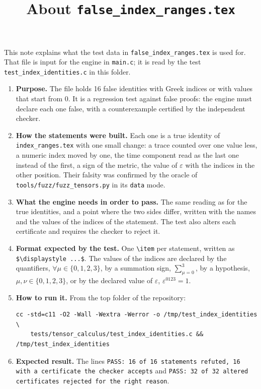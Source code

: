 \documentclass[11pt,a4paper]{article}
\title{About \texttt{false\_index\_ranges.tex}}
\author{}
\date{}
\begin{document}
\maketitle
This note explains what the test data in \texttt{false\_index\_ranges.tex} is used for. That file is input for the engine in \texttt{main.c}; it is read by the test \texttt{test\_index\_identities.c} in this folder.

\begin{enumerate}
\item \textbf{Purpose.} The file holds 16 false identities with Greek indices or with values that start from 0. It is a regression test against false proofs: the engine must declare each one false, with a counterexample certified by the independent checker.

\item \textbf{How the statements were built.} Each one is a true identity of \texttt{index\_ranges.tex} with one small change: a trace counted over one value less, a numeric index moved by one, the time component read as the last one instead of the first, a sign of the metric, the value of $\varepsilon$ with the indices in the other position. Their falsity was confirmed by the oracle of \texttt{tools/fuzz/fuzz\_tensors.py} in its \texttt{data} mode.

\item \textbf{What the engine needs in order to pass.} The same reading as for the true identities, and a point where the two sides differ, written with the names and the values of the indices of the statement. The test also alters each certificate and requires the checker to reject it.

\item \textbf{Format expected by the test.} One \texttt{\textbackslash item} per statement, written as \texttt{\$\textbackslash displaystyle ...\$}. The values of the indices are declared by the quantifiers, $\forall \mu \in \{0, 1, 2, 3\}$, by a summation sign, $\sum_{\mu=0}^{3}$, by a hypothesis, $\mu, \nu \in \{0, 1, 2, 3\}$, or by the declared value of $\varepsilon$, $\varepsilon^{0123} = 1$.

\item \textbf{How to run it.} From the top folder of the repository:
\begin{verbatim}
cc -std=c11 -O2 -Wall -Wextra -Werror -o /tmp/test_index_identities \
    tests/tensor_calculus/test_index_identities.c && /tmp/test_index_identities
\end{verbatim}

\item \textbf{Expected result.} The lines \texttt{PASS: 16 of 16 statements refuted, 16 with a certificate the checker accepts} and \texttt{PASS: 32 of 32 altered certificates rejected for the right reason}.

\end{enumerate}
\end{document}
